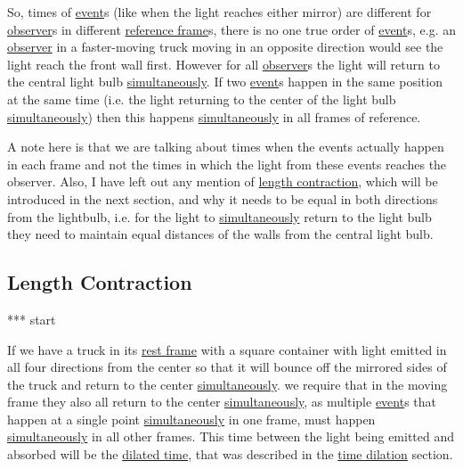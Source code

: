 So, times of \hyperlink{def-event}{event}s (like when the light reaches either mirror) are different for \hyperlink{def-observer}{observer}s in different \hyperlink{def-Reference-frame}{reference frame}s, there is no one true order of \hyperlink{def-event}{event}s, e.g. an \hyperlink{def-observer}{observer} in a faster-moving truck moving in an opposite direction would see the light reach the front wall first.
However for all \hyperlink{def-observer}{observer}s the light will return to the central light bulb \hyperlink{def-simultaneity}{simultaneously}. If two \hyperlink{def-event}{event}s happen in the same position at the same time (i.e. the light returning to the center of the light bulb \hyperlink{def-simultaneity}{simultaneously}) then this happens \hyperlink{def-simultaneity}{simultaneously} in all frames of reference.

A note here is that we are talking about times when the events actually happen in each frame and not the times in which the light from these events reaches the observer. Also, I have left out any mention of \hyperlink{def-length-contraction}{length contraction}, which will be introduced in the next section, and why it needs to be equal in both directions from the lightbulb, i.e. for the light to \hyperlink{def-simultaneity}{simultaneously} return to the light bulb they need to maintain equal distances of the walls from the central light bulb.

\subsection{Length Contraction}

*** start

If we have a truck in its \hyperlink{def-proper-frame}{rest frame} with a square container with light emitted in all four directions from the center so that it will bounce off the mirrored sides of the truck and return to the center \hyperlink{def-simultaneity}{simultaneously}. we require that in the moving frame they also all return to the center \hyperlink{def-simultaneity}{simultaneously}, as multiple \hyperlink{def-event}{event}s that happen at a single point \hyperlink{def-simultaneity}{simultaneously} in one frame, must happen \hyperlink{def-simultaneity}{simultaneously} in all other frames. This time between the light being emitted and absorbed will be the \hyperlink{def-time-dilation}{dilated time}, that was described in the \hyperlink{def-time-dilation}{time dilation} section.

